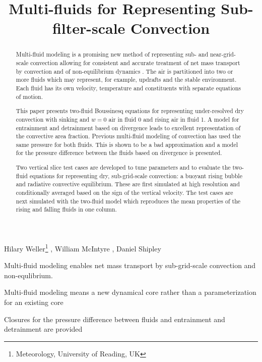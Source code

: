 \documentclass[draft]{agujournal2019}
\begin{document}
\title{Multi-fluids for Representing Sub-filter-scale Convection}

\authors
{
    Hilary Weller\thanks{Meteorology, University of Reading, UK}
    ,
    William McIntyre
    ,
    Daniel Shipley
}



\begin{keypoints}
\item Multi-fluid modeling enables net mass transport by sub-grid-scale convection and non-equlibrium.
\item Multi-fluid modeling means a new dynamical core rather than a parameterization for an existing core
\item Closures for the pressure difference between fluids and entrainment and detrainment are provided
\end{keypoints}

\begin{abstract}
Multi-fluid modeling is a promising new method of representing sub- and near-grid-scale convection allowing for consistent and accurate
treatment of net mass transport by convection and of non-equilibrium dynamics . The air is partitioned into two or more
fluids which may represent, for example, updrafts and the stable environment. Each fluid has its own velocity, temperature and constituents
with separate equations of motion.  

This paper presents two-fluid Boussinesq equations for representing under-resolved dry convection
with sinking and $w=0$ air in fluid 0 and rising air in fluid 1. A model for entrainment
and detrainment based on divergence  leads to excellent representation of the convective area fraction.
Previous multi-fluid modeling of convection has
used the same pressure for both fluids.
This is shown to be a bad approximation and  a model
for the pressure difference between the fluids based on divergence is presented. 

Two vertical slice test cases are developed to tune parameters and to evaluate the two-fluid equations for representing dry, sub-grid-scale convection: a buoyant rising bubble and radiative convective equilibrium. These
are first simulated at high resolution and conditionally averaged based
on the sign of the vertical velocity. The test cases are next simulated with the two-fluid model which  reproduces
the mean properties of the rising and falling fluids in one column. 
\end{abstract}
\end{document}
